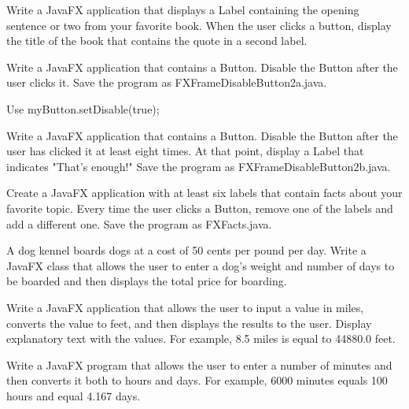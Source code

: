\documentclass[11pt]{exam}
\begin{document}
\begin{questions}

\question Write a JavaFX application that displays a Label containing the opening sentence or two from your favorite book.  When the user clicks a button, display the title of the book that contains the quote in a second label.
        
\question    Write a JavaFX application that contains a Button.  Disable the Button after the user clicks it.  Save the program as FXFrameDisableButton2a.java.

Use myButton.setDisable(true);
    


\question Write a JavaFX application that contains a Button.  Disable the Button after the user has clicked it at least eight times.  At that point, display a Label that indicates "That's enough!"  Save the program as FXFrameDisableButton2b.java.


    
\question Create a JavaFX application with at least six labels that contain facts about your favorite topic.  Every time the user clicks a Button, remove one of the labels and add a different one.  Save the program as FXFacts.java. 

\question A dog kennel boards dogs at a cost of 50 cents per pound per day.  Write a JavaFX class that allows the user to enter a dog's weight and number of days to be boarded and then displays the total price for boarding.

\question Write a JavaFX application that allows the user to input a value in miles, converts the value to feet, and then displays the results to the user.  Display explanatory text with the values.  For example, 8.5 miles is equal to 44880.0 feet.

\question  Write a JavaFX program that allows the user to enter a number of minutes and then converts it both to hours and days.  For example, 6000 minutes equals 100 hours and equal 4.167 days.
\end{questions}	
\end{document}

